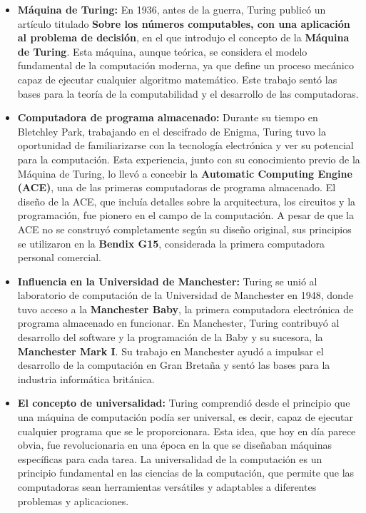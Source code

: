 \documentclass{article}
\begin{document}
\begin{itemize}
    \item \textbf{Máquina de Turing:} En 1936, antes de la guerra, Turing publicó un 
    artículo titulado \textbf{Sobre los números computables, con una aplicación al problema 
    de decisión}, en el que introdujo el concepto de la \textbf{Máquina de Turing}. 
    Esta máquina, aunque teórica, se considera el modelo fundamental de la computación moderna, 
    ya que define un proceso mecánico capaz de ejecutar cualquier algoritmo matemático. 
    Este trabajo sentó las bases para la teoría de la computabilidad y el desarrollo de las computadoras.
    
    \item \textbf{Computadora de programa almacenado:} Durante su tiempo en Bletchley Park, 
    trabajando en el descifrado de Enigma, Turing tuvo la oportunidad de familiarizarse con 
    la tecnología electrónica y ver su potencial para la computación. Esta experiencia, junto 
    con su conocimiento previo de la Máquina de Turing, lo llevó a concebir la 
    \textbf{Automatic Computing Engine (ACE)}, una de las primeras computadoras de programa almacenado. 
    El diseño de la ACE, que incluía detalles sobre la arquitectura, los circuitos y la programación, 
    fue pionero en el campo de la computación. A pesar de que la ACE no se construyó completamente 
    según su diseño original, sus principios se utilizaron en la \textbf{Bendix G15}, considerada 
    la primera computadora personal comercial.
    
    \item \textbf{Influencia en la Universidad de Manchester:} Turing se unió al laboratorio de 
    computación de la Universidad de Manchester en 1948, donde tuvo acceso a la \textbf{Manchester Baby}, 
    la primera computadora electrónica de programa almacenado en funcionar. En Manchester, 
    Turing contribuyó al desarrollo del software y la programación de la Baby y su sucesora, 
    la \textbf{Manchester Mark I}. Su trabajo en Manchester ayudó a impulsar el desarrollo 
    de la computación en Gran Bretaña y sentó las bases para la industria informática británica.
    
    \item \textbf{El concepto de universalidad:} Turing comprendió desde el principio que 
    una máquina de computación podía ser universal, es decir, capaz de ejecutar cualquier 
    programa que se le proporcionara. Esta idea, que hoy en día parece obvia, fue 
    revolucionaria en una época en la que se diseñaban máquinas específicas para cada tarea. 
    La universalidad de la computación es un principio fundamental en las ciencias de 
    la computación, que permite que las computadoras sean herramientas versátiles y 
    adaptables a diferentes problemas y aplicaciones.
    

\end{itemize}
\end{document}

